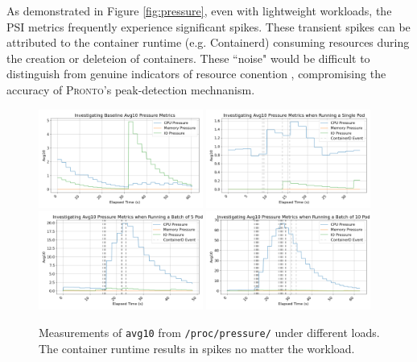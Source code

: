 As demonstrated in Figure \ref{fig:pressure}, even with lightweight workloads,
the PSI metrics frequently experience significant spikes. These transient spikes
can be attributed to the container runtime (e.g. Containerd) consuming resources
during the creation or deleteion of containers. These ``noise" would be
difficult to distinguish from genuine indicators of resource conention ,
compromising the accuracy of \textsc{Pronto}'s peak-detection mechnanism.

\begin{figure}[ht]
    \centering
    \includegraphics[width=0.48\textwidth]{images/avg-pressure-baseline.png}
    \includegraphics[width=0.48\textwidth]{images/avg-pressure-single.png} \\
    \includegraphics[width=0.48\textwidth]{images/avg-pressure-smallbatch.png}
    \includegraphics[width=0.48\textwidth]{images/avg-pressure-bigbatch.png}
    \caption{Measurements of \texttt{avg10} from \texttt{/proc/pressure/} under
    different loads. The container runtime results in spikes no matter the
    workload.} \label{fig:pressure-avg}
\end{figure}
